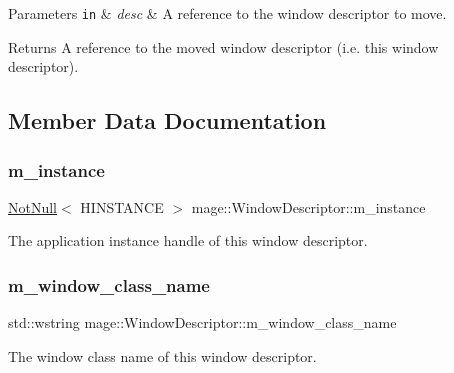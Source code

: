\begin{DoxyParams}[1]{Parameters}
\mbox{\tt in}  & {\em desc} & A reference to the window descriptor to move. \\
\hline
\end{DoxyParams}
\begin{DoxyReturn}{Returns}
A reference to the moved window descriptor (i.\+e. this window descriptor). 
\end{DoxyReturn}


\subsection{Member Data Documentation}
\mbox{\label{classmage_1_1_window_descriptor_afa7ab62493d51db5d1ab6a4167f2da4a}} 
\subsubsection{\texorpdfstring{m\+\_\+instance}{m\_instance}}
{\footnotesize\ttfamily \mbox{\hyperlink{namespacemage_a8769f9d670d6b585ea306cb1062af94b}{Not\+Null}}$<$ H\+I\+N\+S\+T\+A\+N\+CE $>$ mage\+::\+Window\+Descriptor\+::m\+\_\+instance\hspace{0.3cm}{\ttfamily [private]}}

The application instance handle of this window descriptor. \mbox{\label{classmage_1_1_window_descriptor_a773ae3d93c90d65690f18d79945530ed}} 
\subsubsection{\texorpdfstring{m\+\_\+window\+\_\+class\+\_\+name}{m\_window\_class\_name}}
{\footnotesize\ttfamily std\+::wstring mage\+::\+Window\+Descriptor\+::m\+\_\+window\+\_\+class\+\_\+name\hspace{0.3cm}{\ttfamily [private]}}

The window class name of this window descriptor. 